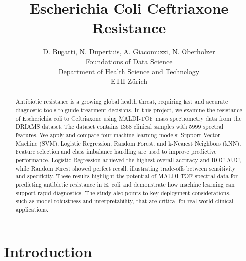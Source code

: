 \documentclass{article}
\title{Escherichia Coli Ceftriaxone Resistance}
\author{%
  D. Bugatti, N. Dupertuis, A. Giacomuzzi, N. Oberholzer\\
  Foundations of Data Science\\
  Department of Health Science and Technology\\
  ETH Zürich\\
}
\begin{document}
\maketitle

\begin{abstract}
Antibiotic resistance is a growing global health threat, requiring fast and accurate diagnostic tools to guide treatment decisions. In this project, we examine the resistance of Escherichia coli to Ceftriaxone using MALDI-TOF mass spectrometry data from the DRIAMS dataset. The dataset contains 1368 clinical samples with 5999 spectral features. We apply and compare four machine learning models: Support Vector Machine (SVM), Logistic Regression, Random Forest, and k-Nearest Neighbors (kNN). Feature selection and class imbalance handling are used to improve predictive performance. Logistic Regression achieved the highest overall accuracy and ROC AUC, while Random Forest showed perfect recall, illustrating trade-offs between sensitivity and specificity. These results highlight the potential of MALDI-TOF spectral data for predicting antibiotic resistance in E. coli and demonstrate how machine learning can support rapid diagnostics. The study also points to key deployment considerations, such as model robustness and interpretability, that are critical for real-world clinical applications.
\end{abstract}


\section{Introduction}
\end{document}
